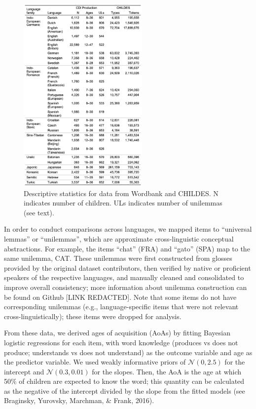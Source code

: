 \documentclass[10pt, letterpaper]{article}
\newenvironment{CodeChunk}{}{}
\begin{document}
\begin{CodeChunk}
\begin{figure}[ht]

{\centering \includegraphics[width=240px]{figs/descriptives} 

}

\caption[Descriptive statistics for data from Wordbank and CHILDES]{Descriptive statistics for data from Wordbank and CHILDES. N indicates number of children. ULs indicates number of unilemmas (see text).}\label{fig:descriptives}
\end{figure}
\end{CodeChunk}

In order to conduct comparisons across languages, we mapped items to
``universal lemmas'' or ``unilemmas'', which are approximate
cross-linguistic conceptual abstractions. For example, the items
``chat'' (FRA) and ``gato'' (SPA) map to the same unilemma, CAT. These
unilemmas were first constructed from glosses provided by the original
dataset contributors, then verified by native or proficient speakers of
the respective languages, and manually cleaned and consolidated to
improve overall consistency; more information about unilemma
construction can be found on Github {[}LINK REDACTED{]}. Note that some
items do not have corresponding unilemmas (e.g., language-specific items
that were not relevant cross-linguistically); these items were dropped
for analysis.

From these data, we derived ages of acquisition (AoAs) by fitting
Bayesian logistic regressions for each item, with word knowledge
(produces vs does not produce; understands vs does not understand) as
the outcome variable and age as the predictor variable. We used weakly
informative priors of \(\mathcal{N}(0, 2.5)\) for the intercept and
\(\mathcal{N}(0.3, 0.01)\) for the slopes. Then, the AoA is the age at
which 50\% of children are expected to know the word; this quantity can
be calculated as the negative of the intercept divided by the slope from
the fitted models (see Braginsky, Yurovsky, Marchman, \& Frank, 2016).
\end{document}
